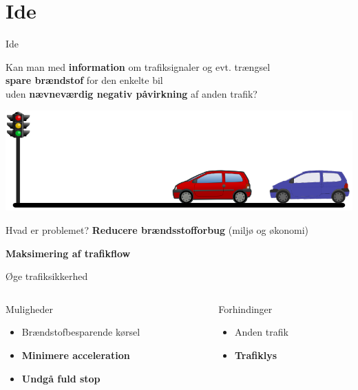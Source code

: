 \section{Ide}

\begin{frame}{Ide}
\begin{center}
Kan man med \textbf{information} om trafiksignaler og evt. trængsel\\\textbf{spare brændstof} for den enkelte bil\\uden \textbf{nævneværdig negativ påvirkning} af anden trafik?
\end{center}
\includegraphics[width=1\textwidth]{../images/idea.png}
\end{frame}

\begin{frame}{Hvad er problemet?}
\textbf{Reducere brændsstofforbug} (miljø og økonomi)

\textbf{Maksimering af trafikflow}

Øge trafiksikkerhed

\vspace{5mm}
\begin{columns}
\begin{column}{0.5\textwidth}
Muligheder
\begin{itemize}
\item Brændstofbesparende kørsel
\item \textbf{Minimere acceleration}
\item \textbf{Undgå fuld stop}
\end{itemize}

\end{column}
\begin{column}{0.4\textwidth}
Forhindinger
\begin{itemize}
\item Anden trafik
\item \textbf{Trafiklys}
\end{itemize}
\end{column}
\end{columns}
\end{frame}

